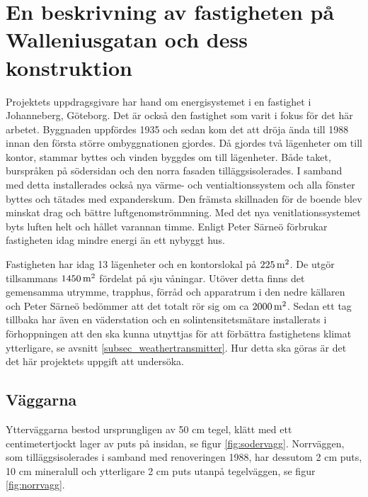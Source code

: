 \section{En beskrivning av fastigheten på Walleniusgatan och dess konstruktion}
\label{subsec:thehouse}




Projektets uppdragsgivare har hand om energisystemet i en fastighet i Johanneberg, Göteborg. Det är också den fastighet som varit i fokus för det här arbetet. Byggnaden uppfördes 1935\cite{ritningar_urspr} och sedan kom det att dröja ända till 1988 innan den första större ombyggnationen gjordes. Då gjordes två lägenheter om till kontor, stammar byttes och vinden byggdes om till lägenheter. Både taket, burspråken på södersidan och den norra fasaden tilläggsisolerades. I samband med detta installerades också nya värme- och ventialtionssystem och alla fönster byttes och tätades med expanderskum. Den främsta skillnaden för de boende blev minskat drag och bättre luftgenomströmmning.  Med det nya venitlationssystemet byts luften helt och hållet varannan timme. Enligt Peter Särneö\cite{petersarneo} förbrukar fastigheten idag mindre energi än ett nybyggt hus.

Fastigheten har idag 13 lägenheter och en kontorslokal på $\unit[225]{m^2}$. De utgör tillsammans $\unit[1450]{m^2}$ fördelat på sju våningar. Utöver detta finns det gemensamma utrymme, trapphus, förråd och apparatrum i den nedre källaren och Peter Särneö\cite{petersarneo} bedömmer att det totalt rör sig om ca $\unit[2000]{m^2}$. Sedan ett tag tillbaka har även en väderstation och en solintensitetsmätare installerats i förhoppningen att den ska kunna utnyttjas för att förbättra fastighetens klimat ytterligare, se avsnitt \ref{subsec_weathertransmitter}. Hur detta ska göras är det det här projektets uppgift att undersöka.


\subsection{Väggarna}

Ytterväggarna bestod ursprungligen av 50 cm tegel, klätt med ett centimetertjockt lager av puts på insidan, se figur \ref{fig:sodervagg}. Norrväggen, som tilläggsisolerades i samband med renoveringen 1988, har dessutom 2 cm puts, 10 cm mineralull och ytterligare 2 cm puts utanpå tegelväggen, se figur \ref{fig:norrvagg}.\cite{kandidatarbete2010}\cite{petersarneo}

